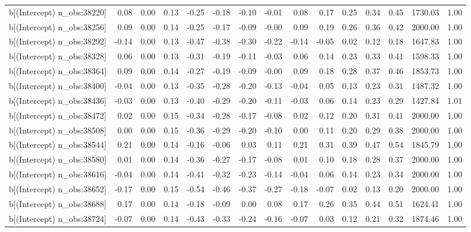 \begin{table}[ht]
\begin{tabular}{rrrrrrrrrrrrrrr}
  b[(Intercept) n\_obs:38220] & 0.08 & 0.00 & 0.13 & -0.25 & -0.18 & -0.10 & -0.01 & 0.08 & 0.17 & 0.25 & 0.34 & 0.45 & 1730.03 & 1.00 \\ 
  b[(Intercept) n\_obs:38256] & 0.09 & 0.00 & 0.14 & -0.25 & -0.17 & -0.09 & -0.00 & 0.09 & 0.19 & 0.26 & 0.36 & 0.42 & 2000.00 & 1.00 \\ 
  b[(Intercept) n\_obs:38292] & -0.14 & 0.00 & 0.13 & -0.47 & -0.38 & -0.30 & -0.22 & -0.14 & -0.05 & 0.02 & 0.12 & 0.18 & 1647.83 & 1.00 \\ 
  b[(Intercept) n\_obs:38328] & 0.06 & 0.00 & 0.13 & -0.31 & -0.19 & -0.11 & -0.03 & 0.06 & 0.14 & 0.23 & 0.33 & 0.41 & 1598.33 & 1.00 \\ 
  b[(Intercept) n\_obs:38364] & 0.09 & 0.00 & 0.14 & -0.27 & -0.19 & -0.09 & -0.00 & 0.09 & 0.18 & 0.28 & 0.37 & 0.46 & 1853.73 & 1.00 \\ 
  b[(Intercept) n\_obs:38400] & -0.04 & 0.00 & 0.13 & -0.35 & -0.28 & -0.20 & -0.13 & -0.04 & 0.05 & 0.13 & 0.23 & 0.31 & 1487.32 & 1.00 \\ 
  b[(Intercept) n\_obs:38436] & -0.03 & 0.00 & 0.13 & -0.40 & -0.29 & -0.20 & -0.11 & -0.03 & 0.06 & 0.14 & 0.23 & 0.29 & 1427.84 & 1.01 \\ 
  b[(Intercept) n\_obs:38472] & 0.02 & 0.00 & 0.15 & -0.34 & -0.28 & -0.17 & -0.08 & 0.02 & 0.12 & 0.20 & 0.31 & 0.41 & 2000.00 & 1.00 \\ 
  b[(Intercept) n\_obs:38508] & 0.00 & 0.00 & 0.15 & -0.36 & -0.29 & -0.20 & -0.10 & 0.00 & 0.11 & 0.20 & 0.29 & 0.38 & 2000.00 & 1.00 \\ 
  b[(Intercept) n\_obs:38544] & 0.21 & 0.00 & 0.14 & -0.16 & -0.06 & 0.03 & 0.11 & 0.21 & 0.31 & 0.39 & 0.47 & 0.54 & 1845.79 & 1.00 \\ 
  b[(Intercept) n\_obs:38580] & 0.01 & 0.00 & 0.14 & -0.36 & -0.27 & -0.17 & -0.08 & 0.01 & 0.10 & 0.18 & 0.28 & 0.37 & 2000.00 & 1.00 \\ 
  b[(Intercept) n\_obs:38616] & -0.04 & 0.00 & 0.14 & -0.41 & -0.32 & -0.23 & -0.14 & -0.04 & 0.06 & 0.14 & 0.23 & 0.34 & 2000.00 & 1.00 \\ 
  b[(Intercept) n\_obs:38652] & -0.17 & 0.00 & 0.15 & -0.54 & -0.46 & -0.37 & -0.27 & -0.18 & -0.07 & 0.02 & 0.13 & 0.20 & 2000.00 & 1.00 \\ 
  b[(Intercept) n\_obs:38688] & 0.17 & 0.00 & 0.14 & -0.18 & -0.09 & 0.00 & 0.08 & 0.17 & 0.26 & 0.35 & 0.44 & 0.51 & 1624.41 & 1.00 \\ 
  b[(Intercept) n\_obs:38724] & -0.07 & 0.00 & 0.14 & -0.43 & -0.33 & -0.24 & -0.16 & -0.07 & 0.03 & 0.12 & 0.21 & 0.32 & 1874.46 & 1.00 \\ 

\end{tabular}
\end{table}

